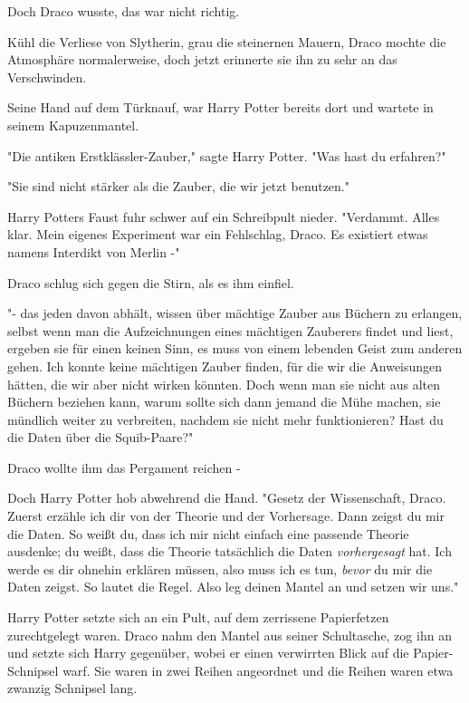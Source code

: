 {Doch Draco wusste, das war nicht richtig.

Kühl die Verliese von Slytherin, grau die steinernen Mauern, Draco mochte die Atmosphäre normalerweise, doch jetzt erinnerte sie ihn zu sehr an das Verschwinden.

Seine Hand auf dem Türknauf, war Harry Potter bereits dort und wartete in seinem Kapuzenmantel.

"Die antiken Erstklässler-Zauber," sagte Harry Potter. "Was hast du erfahren?"

"Sie sind nicht stärker als die Zauber, die wir jetzt benutzen."

Harry Potters Faust fuhr schwer auf ein Schreibpult nieder. "Verdammt. Alles klar. Mein eigenes Experiment war ein Fehlschlag, Draco. Es existiert etwas namens Interdikt von Merlin -"

Draco schlug sich gegen die Stirn, als es ihm einfiel.

"- das jeden davon abhält, wissen über mächtige Zauber aus Büchern zu erlangen, selbst wenn man die Aufzeichnungen eines mächtigen Zauberers findet und liest, ergeben sie für einen keinen Sinn, es muss von einem lebenden Geist zum anderen gehen. Ich konnte keine mächtigen Zauber finden, für die wir die Anweisungen hätten, die wir aber nicht wirken könnten. Doch wenn man sie nicht aus alten Büchern beziehen kann, warum sollte sich dann jemand die Mühe machen, sie mündlich weiter zu verbreiten, nachdem sie nicht mehr funktionieren? Hast du die Daten über die Squib-Paare?"

Draco wollte ihm das Pergament reichen -

Doch Harry Potter hob abwehrend die Hand. "Gesetz der Wissenschaft, Draco. Zuerst erzähle ich dir von der Theorie und der Vorhersage. Dann zeigst du mir die Daten. So weißt du, dass ich mir nicht einfach eine passende Theorie ausdenke; du weißt, dass die Theorie tatsächlich die Daten \emph{vorhergesagt} hat. Ich werde es dir ohnehin erklären müssen, also muss ich es tun, \emph{bevor} du mir die Daten zeigst. So lautet die Regel. Also leg deinen Mantel an und setzen wir uns."

Harry Potter setzte sich an ein Pult, auf dem zerrissene Papierfetzen zurechtgelegt waren. Draco nahm den Mantel aus seiner Schultasche, zog ihn an und setzte sich Harry gegenüber, wobei er einen verwirrten Blick auf die Papier-Schnipsel warf. Sie waren in zwei Reihen angeordnet und die Reihen waren etwa zwanzig Schnipsel lang.

}
